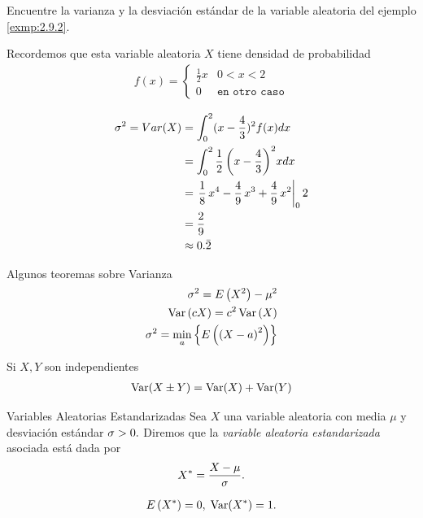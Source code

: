  \begin{ejemplo} %
  \label{exmp:2.9.4}
  Encuentre la varianza y la desviación estándar de la variable aleatoria del ejemplo \ref{exmp:2.9.2}.
 \end{ejemplo}


{}
Recordemos que esta variable aleatoria $X$ tiene densidad de probabilidad
  \begin{align}
   f(x)=
   \begin{cases}
    \frac{1}{2}x & 0<x<2 \\
    0 & \texttt{en otro caso}
   \end{cases}
  \end{align}

{}
\begin{align}
 \sigma^2 = Var(X) &= \displaystyle \int_{0}^{2}(x-\frac{4}{3})^2f(x) dx
 \\  &= \displaystyle \int_{0}^{2} \frac{1}{2} \, {\left(x - \frac{4}{3}\right)}^{2} x dx
 \\  &= \displaystyle
 \left. \frac{1}{8} \, x^{4} - \frac{4}{9} \, x^{3} + \frac{4}{9} \, x^{2} \right|_{0}{2}
 \\  &= \displaystyle \frac{2}{9}
\\  &\approx \displaystyle 0.\bar{2}
\end{align}

{Algunos teoremas sobre Varianza}
\begin{align}
 \label{eq:2.9.14}
 \sigma^{2}=E\left( X^{2} \right)-\mu^{2} \\ 
 \label{eq:2.9.15}
 \operatorname{Var}\left( cX \right)=c^{2}\operatorname{Var}\left( X \right)\\ 
 \label{thm:2.9.3}
 \sigma^{2}=\min_{a}\left\{ E\left( \left( X-a \right)^{2} \right) \right\}
\end{align}

Si $X,Y$ son independientes
\begin{align}
 \label{eq:2.9.16}
 \operatorname{Var}(X\pm Y)=\operatorname{Var}(X)+\operatorname{Var}(Y)
\end{align}


{Variables Aleatorias Estandarizadas}
 Sea $X$ una variable aleatoria con media $\mu$ y desviación estándar $\sigma>0.$ Diremos que la \emph{variable aleatoria estandarizada} asociada está dada por
 \begin{align}
  \label{eq:2.9.17}
  X^{*}=\dfrac{X-\mu}{\sigma}.
 \end{align}


\begin{align}
 \label{eq:2.9.18}
 E\left( X^{*} \right)=0, \; \operatorname{Var}(X^{*})=1.
\end{align}


